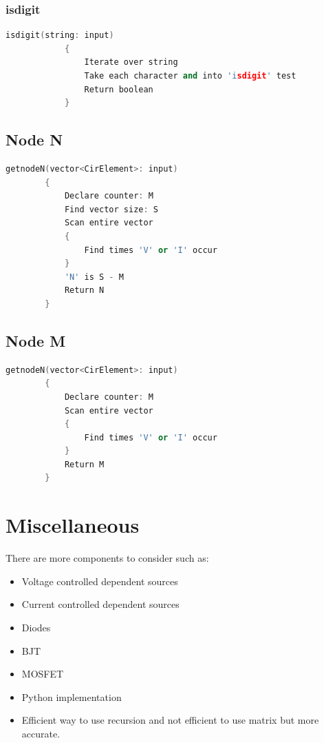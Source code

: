 \documentclass[a4paper, titlepage]{article}
\begin{document}
    \subsubsection{isdigit}
    \begin{lstlisting}[language=C++]
        isdigit(string: input)
            {
                Iterate over string
                Take each character and into 'isdigit' test
                Return boolean
            }
    \end{lstlisting}
    \subsection{Node N}
    \begin{lstlisting}[language=C++]
        getnodeN(vector<CirElement>: input)
        {
            Declare counter: M
            Find vector size: S
            Scan entire vector
            {
                Find times 'V' or 'I' occur
            }
            'N' is S - M
            Return N
        }
    \end{lstlisting}
    \subsection{Node M}
    \begin{lstlisting}[language=C++]
        getnodeN(vector<CirElement>: input)
        {
            Declare counter: M
            Scan entire vector
            {
                Find times 'V' or 'I' occur
            }
            Return M
        }
    \end{lstlisting}

    \pagebreak
    \section{Miscellaneous}
    There are more components to consider such as:
    \begin{itemize}
        \item Voltage controlled dependent sources
        \item Current controlled dependent sources
        \item Diodes
        \item BJT
        \item MOSFET
        \item Python implementation
        \item Efficient way to use recursion and not efficient to use matrix but more accurate.
    \end{itemize}


    \pagebreak
    \printbibliography[title={References}]
\end{document}
